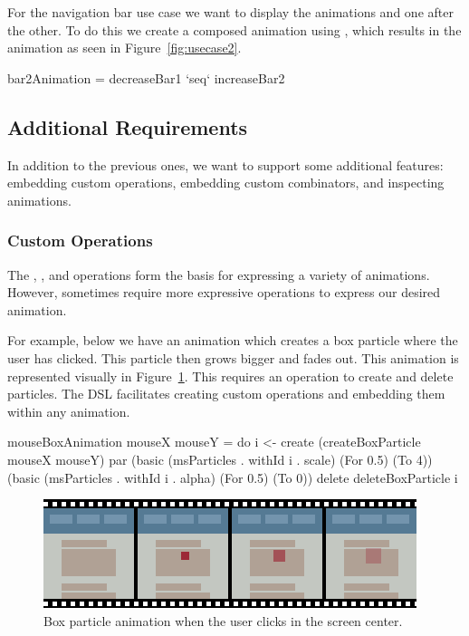 For the navigation bar use case we want to display the animations  and  one after the other. To do this we create a composed animation using , which results in the animation as seen in Figure~\ref{fig:usecase2}.

\begin{spec}
bar2Animation = decreaseBar1 `seq` increaseBar2
\end{spec}

\subsection{Additional Requirements}

In addition to the previous ones, we want to support some additional features: embedding custom operations, embedding custom combinators, and inspecting animations.

\subsubsection{Custom Operations}

The , , and  operations form the basis for expressing a variety of animations. However, sometimes require more expressive operations to express our desired animation.

For example, below we have an animation which creates a box particle where the user has clicked. This particle then grows bigger and fades out. This animation is represented visually in Figure~\ref{fig:usecase3}. This requires an operation to create and delete particles. The DSL facilitates creating custom operations and embedding them within any animation.

\begin{spec}
mouseBoxAnimation mouseX mouseY = do
  i <- create (createBoxParticle mouseX mouseY)
  par (basic (msParticles . withId i . scale) (For 0.5) (To 4))
      (basic (msParticles . withId i . alpha) (For 0.5) (To 0))
  delete deleteBoxParticle i
\end{spec}

\begin{figure}[h]
\centering
\includegraphics[width=\figscale\textwidth]{pictures/usecase3fig}
\caption{Box particle animation when the user clicks in the screen center.}
\label{fig:usecase3}
\end{figure}

